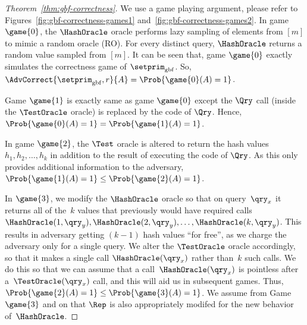 \begin{proof}[Theorem~\ref{thm:gbf-correctness}]
We use a game playing argument, please refer to Figures~\ref{fig:gbf-correctness-games1} and~\ref{fig:gbf-correctness-games2}. In game $\game{0}$, the $\HashOracle$ oracle performs lazy sampling of elements from $[m]$ to mimic a random oracle (RO). For every distinct query, $\HashOracle$ returns a random value sampled from $[m]$. It can be seen that, game $\game{0}$ exactly simulates the correctness game of $\setprim_{\mathrm{gbf}}$.  So, $\AdvCorrect{\setprim_{\mathrm{gbf}},r}{A} = \Prob{\game{0}(A) = 1}$.

Game $\game{1}$ is exactly same as game $\game{0}$ except the $\Qry$ call (inside the $\TestOracle$ oracle) is replaced by the code of $\Qry$.  Hence, $\Prob{\game{0}(A) = 1} = \Prob{\game{1}(A) = 1}$.

In game $\game{2}$, the $\Test$ oracle is altered to return the hash values~$h_1,h_2,\ldots, h_k$ in addition to the result of executing the code of $\Qry$.  As this only provides additional information to the adversary, $\Prob{\game{1}(A) = 1} \leq \Prob{\game{2}(A) = 1}$.

In $\game{3}$, we modify the $\HashOracle$ oracle so that on query~$\qry_x$ it returns all of the~$k$ values that previously would have required calls $\HashOracle(1,\qry_y),\HashOracle(2,\qry_y),\ldots,\linebreak\HashOracle(k,\qry_y)$.  This results in adversary getting $(k-1)$ hash values ``for free'', as we charge the adversary only for a single query.  We alter the $\TestOracle$ oracle accordingly, so that it makes a single call $\HashOracle(\qry_x)$ rather than~$k$ such calls.  
We do this so that we can assume that a call~$\HashOracle(\qry_x)$ is pointless after a~$\TestOracle(\qry_x)$ call, and this will aid us in subsequent games.    Thus, $\Prob{\game{2}(A) = 1} \leq \Prob{\game{3}(A) = 1}$. We assume from Game~$\game{3}$ and on that $\Rep$ is also appropriately modifed for the new behavior of~$\HashOracle$.


\end{proof}
